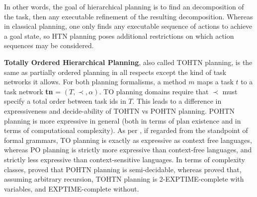 In other words, the goal of hierarchical planning is to find an decomposition of the task, then any executable refinement of the resulting decomposition. Whereas in classical planning, one only finds any executable sequence of actions to achieve a goal state, so HTN planning poses additional restrictions on which action sequences may be considered.

\textbf{Totally Ordered Hierarchical Planning}, also called TOHTN planning, is the same as partially ordered planning in all respects except the kind of task networks it allows.
For both planning formalisms, a method $m$ maps a task $t$ to a task network \textbf{tn} = $(T, \prec, \alpha)$. TO planning domains require that $\prec$ must specify a total order between task ids in $T$.
This leads to a difference in expressiveness and decide-ability of TOHTN vs POHTN planning. POHTN planning is more expressive in general (both in terms of plan existence and in terms of computational complexity). As per \cite{LanguageClassificationPlanning}, if regarded from the standpoint of formal grammars, TO planning is exactly as expressive as context free languages, whereas PO planning is strictly more expressive than context-free languages, and strictly less expressive than context-sensitive languages.
In terms of complexity classes, \cite{ErolHTNExpressivity} proved that POHTN planning is semi-decidable, whereas \cite{Alford2015TightHTNBounds} proved that, assuming arbitrary recursion, TOHTN planning is 2-EXPTIME-complete with variables, and EXPTIME-complete without. 





